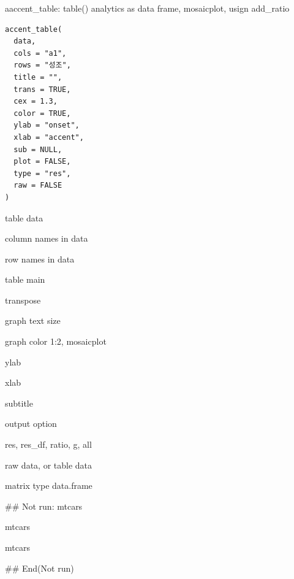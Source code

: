 \documentclass[a4paper]{book}
\begin{document}
%
\begin{Description}
aaccent\_table: table() analytics as data frame, mosaicplot, usign add\_ratio
\end{Description}
%
\begin{Usage}
\begin{verbatim}
accent_table(
  data,
  cols = "a1",
  rows = "성조",
  title = "",
  trans = TRUE,
  cex = 1.3,
  color = TRUE,
  ylab = "onset",
  xlab = "accent",
  sub = NULL,
  plot = FALSE,
  type = "res",
  raw = FALSE
)
\end{verbatim}
\end{Usage}
%
\begin{Arguments}
\begin{ldescription}
\item[\code{data}] table data

\item[\code{cols}] column names in data

\item[\code{rows}] row names in data

\item[\code{title}] table main

\item[\code{trans}] transpose

\item[\code{cex}] graph text size

\item[\code{color}] graph color 1:2, mosaicplot

\item[\code{ylab}] ylab

\item[\code{xlab}] xlab

\item[\code{sub}] subtitle

\item[\code{plot}] output option

\item[\code{type}] res, res\_df, ratio, g, all

\item[\code{raw}] raw data, or table data
\end{ldescription}
\end{Arguments}
%
\begin{Value}
matrix type data.frame
\end{Value}
%
\begin{Examples}
\begin{ExampleCode}

\#\# Not run: 
mtcars %

mtcars %


mtcars %


## End(Not run)



\end{ExampleCode}
\end{Examples}
\end{document}
